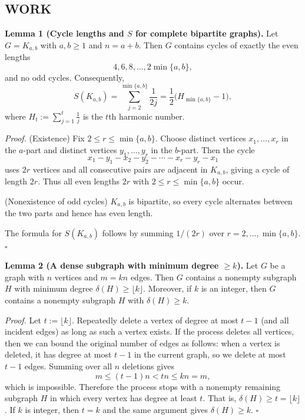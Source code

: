 \subsection*{WORK}
\textbf{Lemma 1 (Cycle lengths and $S$ for complete bipartite graphs).}
Let $G=K_{a,b}$ with $a,b\ge 1$ and $n=a+b$.
Then $G$ contains cycles of exactly the even lengths
\[
4,6,8,\dots,2\min\{a,b\},
\]
and no odd cycles.
Consequently,
\[
S(K_{a,b})=\sum_{j=2}^{\min\{a,b\}} \frac{1}{2j}=\frac12\Big(H_{\min\{a,b\}}-1\Big),
\]
where $H_t:=\sum_{j=1}^t \frac1j$ is the $t$th harmonic number.

\emph{Proof.}
(Existence) Fix $2\le r\le \min\{a,b\}$. Choose distinct vertices $x_1,\dots,x_r$ in the $a$-part and distinct 
vertices $y_1,\dots,y_r$ in the $b$-part. Then the cycle
\[
x_1-y_1-x_2-y_2-\cdots-x_r-y_r-x_1
\]
uses $2r$ vertices and all consecutive pairs are adjacent in $K_{a,b}$, giving a cycle of length $2r$.
Thus all even lengths $2r$ with $2\le r\le\min\{a,b\}$ occur.

(Nonexistence of odd cycles) $K_{a,b}$ is bipartite, so every cycle alternates between the two parts and hence has even 
length.

The formula for $S(K_{a,b})$ follows by summing $1/(2r)$ over $r=2,\dots,\min\{a,b\}$. \hfill$\square$

\medskip
\textbf{Lemma 2 (A dense subgraph with minimum degree $\ge k$).}
Let $G$ be a graph with $n$ vertices and $m=kn$ edges.
Then $G$ contains a nonempty subgraph $H$ with minimum degree $\delta(H)\ge \lfloor k\rfloor$.
Moreover, if $k$ is an integer, then $G$ contains a nonempty subgraph $H$ with $\delta(H)\ge k$.

\emph{Proof.}
Let $t:=\lfloor k\rfloor$.
Repeatedly delete a vertex of degree at most $t-1$ (and all incident edges) as long as such a vertex exists.
If the process deletes all vertices, then we can bound the original number of edges as follows:
when a vertex is deleted, it has degree at most $t-1$ in the current graph, so we delete at most $t-1$ edges.
Summing over all $n$ deletions gives
\[
m\le (t-1)n < tn \le kn=m,
\]
which is impossible.
Therefore the process stops with a nonempty remaining subgraph $H$ in which every vertex has degree at least $t$.
That is, $\delta(H)\ge t=\lfloor k\rfloor$.
If $k$ is integer, then $t=k$ and the same argument gives $\delta(H)\ge k$.
\hfill$\square$

